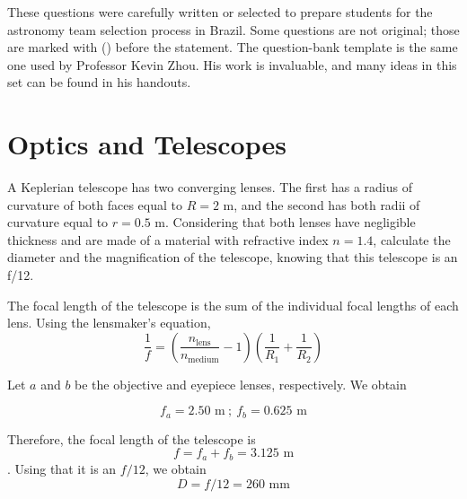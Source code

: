 \documentclass[11pt]{article}
\begin{document}

These questions were carefully written or selected to prepare students for the astronomy team selection process in Brazil. Some questions are not original; those are marked with () before the statement. The question-bank template is the same one used by Professor Kevin Zhou. His work is invaluable, and many ideas in this set can be found in his handouts.




\section{Optics and Telescopes}

    \begin{pproblem} A Keplerian telescope has two converging lenses. The first has a radius of curvature of both faces equal to \(R = 2\text{ m}\), and the second has both radii of curvature equal to \(r = 0.5 \text{ m}\). Considering that both lenses have negligible thickness and are made of a material with refractive index \(n=1.4\), calculate the diameter and the magnification of the telescope, knowing that this telescope is an f/12.
    \begin{pssolution*}{}{}
        The focal length of the telescope is the sum of the individual focal lengths of each lens. Using the lensmaker's equation,
        \[\frac{1}{f} = \left(\frac{n_{\text{lens}}}{n_{\text{medium}}}-1\right)\left(\frac{1}{R_1}+\frac{1}{R_2}\right)\]

        Let \(a\) and \(b\) be the objective and eyepiece lenses, respectively. We obtain
        
        \[f_a = 2.50 \text{ m}\ ; \ f_b = 0.625\text{ m}\]

        Therefore, the focal length of the telescope is \[f = f_a+f_b = 3.125\text{ m}\]. Using that it is an \(f/12\), we obtain
        \[\boxed{D = f/12 = 260 \text{ mm}}\]
    \end{pssolution*}
    \end{pproblem}
\end{document}
